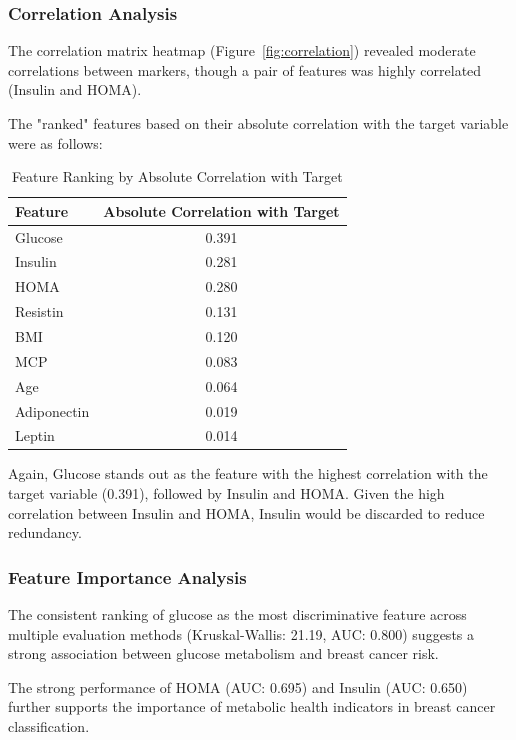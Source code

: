\documentclass[12pt,a4paper]{article}
\begin{document}
\subsubsection{Correlation Analysis}
The correlation matrix heatmap (Figure~\ref{fig:correlation}) revealed moderate correlations between markers, though a pair of features was highly correlated (Insulin and HOMA). 

The "ranked" features based on their absolute correlation with the target variable were as follows:
\begin{table}[H]
\centering
        \begin{tabular}{@{}lc@{}}
            	\toprule
            	\textbf{Feature} & \textbf{Absolute Correlation with Target} \\
            \midrule
            Glucose & 0.391 \\
            Insulin & 0.281 \\
            HOMA & 0.280 \\
            Resistin & 0.131 \\
            BMI & 0.120 \\
            MCP & 0.083 \\
            Age & 0.064 \\
            Adiponectin & 0.019 \\
            Leptin & 0.014 \\
            \bottomrule
        \end{tabular}
\caption{Feature Ranking by Absolute Correlation with Target}
\end{table}

Again, Glucose stands out as the feature with the highest correlation with the target variable (0.391), followed by Insulin and HOMA. Given the high correlation between Insulin and HOMA, Insulin would be discarded to reduce redundancy.

\subsubsection{Feature Importance Analysis}
The consistent ranking of glucose as the most discriminative feature across multiple evaluation methods (Kruskal-Wallis: 21.19, AUC: 0.800) suggests a strong association between glucose metabolism and breast cancer risk.

The strong performance of HOMA (AUC: 0.695) and Insulin (AUC: 0.650) further supports the importance of metabolic health indicators in breast cancer classification. 
\end{document}
